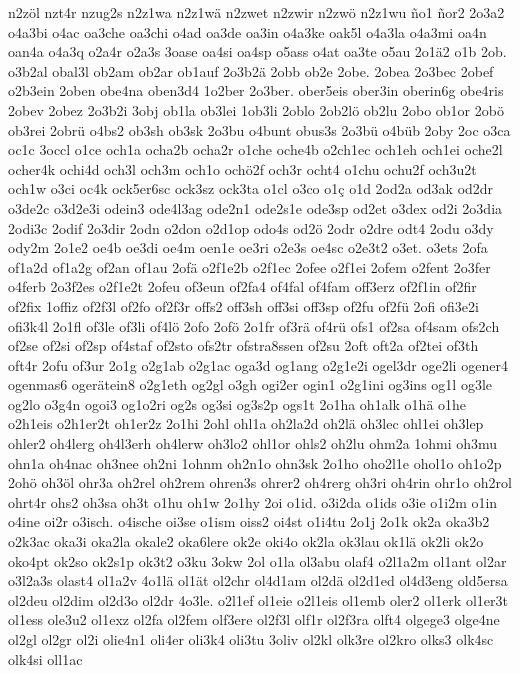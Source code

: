 {n2zöl
nzt4r
nzug2s
n2z1wa
n2z1wä
n2zwet
n2zwir
n2zwö
n2z1wu
ño1
ñor2
2o3a2
o4a3bi
o4ac
oa3che
oa3chi
o4ad
oa3de
oa3in
o4a3ke
oak5l
o4a3la
o4a3mi
oa4n
oan4a
o4a3q
o2a4r
o2a3s
3oase
oa4si
oa4sp
o5ass
o4at
oa3te
o5au
2o1ä2
o1b
2ob.
o3b2al
obal3l
ob2am
ob2ar
ob1auf
2o3b2ä
2obb
ob2e
2obe.
2obea
2o3bec
2obef
o2b3ein
2oben
obe4na
oben3d4
1o2ber
2o3ber.
ober5eis
ober3in
oberin6g
obe4ris
2obev
2obez
2o3b2i
3obj
ob1la
ob3lei
1ob3li
2oblo
2ob2lö
ob2lu
2obo
ob1or
2obö
ob3rei
2obrü
o4bs2
ob3sh
ob3sk
2o3bu
o4bunt
obus3s
2o3bü
o4büb
2oby
2oc
o3ca
oc1c
3occl
o1ce
och1a
ocha2b
ocha2r
o1che
oche4b
o2ch1ec
och1eh
och1ei
oche2l
ocher4k
ochi4d
och3l
och3m
och1o
ochö2f
och3r
ocht4
o1chu
ochu2f
och3u2t
och1w
o3ci
oc4k
ock5er6sc
ock3sz
ock3ta
o1cl
o3co
o1ç
o1d
2od2a
od3ak
od2dr
o3de2c
o3d2e3i
odein3
ode4l3ag
ode2n1
ode2s1e
ode3sp
od2et
o3dex
od2i
2o3dia
2odi3c
2odif
2o3dir
2odn
o2don
o2d1op
odo4s
od2ö
2odr
o2dre
odt4
2odu
o3dy
ody2m
2o1e2
oe4b
oe3di
oe4m
oen1e
oe3ri
o2e3s
oe4sc
o2e3t2
o3et.
o3ets
2ofa
of1a2d
of1a2g
of2an
of1au
2ofä
o2f1e2b
o2f1ec
2ofee
o2f1ei
2ofem
o2fent
2o3fer
o4ferb
2o3f2es
o2f1e2t
2ofeu
of3eun
of2fa4
of4fal
of4fam
off3erz
of2f1in
of2fir
of2fix
1offiz
of2f3l
of2fo
of2f3r
offs2
off3sh
off3si
off3sp
of2fu
of2fü
2ofi
ofi3e2i
ofi3k4l
2o1fl
of3le
of3li
of4lö
2ofo
2ofö
2o1fr
of3rä
of4rü
ofs1
of2sa
of4sam
ofs2ch
of2se
of2si
of2sp
of4staf
of2sto
ofs2tr
ofstra8ssen
of2su
2oft
oft2a
of2tei
of3th
oft4r
2ofu
of3ur
2o1g
o2g1ab
o2g1ac
oga3d
og1ang
o2g1e2i
ogel3dr
oge2li
ogener4
ogenmas6
ogerätein8
o2g1eth
og2gl
o3gh
ogi2er
ogin1
o2g1ini
og3ins
og1l
og3le
og2lo
o3g4n
ogoi3
og1o2ri
og2s
og3si
og3s2p
ogs1t
2o1ha
oh1alk
o1hä
o1he
o2h1eis
o2h1er2t
oh1er2z
2o1hi
2ohl
ohl1a
oh2la2d
oh2lä
oh3lec
ohl1ei
oh3lep
ohler2
oh4lerg
oh4l3erh
oh4lerw
oh3lo2
ohl1or
ohls2
oh2lu
ohm2a
1ohmi
oh3mu
ohn1a
oh4nac
oh3nee
oh2ni
1ohnm
oh2n1o
ohn3sk
2o1ho
oho2l1e
ohol1o
oh1o2p
2ohö
oh3öl
ohr3a
oh2rel
oh2rem
ohren3s
ohrer2
oh4rerg
oh3ri
oh4rin
ohr1o
oh2rol
ohrt4r
ohs2
oh3sa
oh3t
o1hu
oh1w
2o1hy
2oi
o1id.
o3i2da
o1ids
o3ie
o1i2m
o1in
o4ine
oi2r
o3isch.
o4ische
oi3se
o1ism
oiss2
oi4st
o1i4tu
2o1j
2o1k
ok2a
oka3b2
o2k3ac
oka3i
oka2la
okale2
oka6lere
ok2e
oki4o
ok2la
ok3lau
ok1lä
ok2li
ok2o
oko4pt
ok2so
ok2s1p
ok3t2
o3ku
3okw
2ol
o1la
ol3abu
olaf4
o2l1a2m
ol1ant
ol2ar
o3l2a3s
olast4
ol1a2v
4o1lä
ol1ät
ol2chr
ol4d1am
ol2dä
ol2d1ed
ol4d3eng
old5ersa
ol2deu
ol2dim
ol2d3o
ol2dr
4o3le.
o2l1ef
ol1eie
o2l1eis
ol1emb
oler2
ol1erk
ol1er3t
ol1ess
ole3u2
ol1exz
ol2fa
ol2fem
olf3ere
ol2f3l
olf1r
ol2f3ra
olft4
olgege3
olge4ne
ol2gl
ol2gr
ol2i
olie4n1
oli4er
oli3k4
oli3tu
3oliv
ol2kl
olk3re
ol2kro
olks3
olk4sc
olk4si
oll1ac
}
